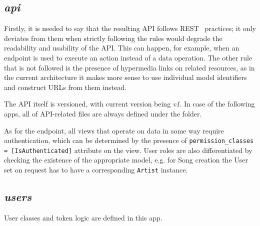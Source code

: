 \subsection{\textit{api}}
Firstly, it is needed to say that the resulting API follows REST~\cite{restdef} practices; it only deviates from them
when strictly following the rules would degrade the readability and usability of the API.
This can happen, for example, when an endpoint is used to execute an action instead of a data operation.
The other rule that is not followed is the presence of hypermedia links on related resources,
as in the current architecture it makes more sense to use
individual model identifiers and construct URLs from them instead.

The API itself is versioned, with current version being \textit{v1}.
In case of the following apps, all of API-related files are always defined under the  folder.

As for the endpoint, all views that operate on data in some way require authentication, which can be determined
by the presence of \texttt{permission_classes = [IsAuthenticated]} attribute on the view. User roles
are also differentiated by checking the existence of the appropriate model, e.g. for Song creation the User set
on request has to have a corresponding \texttt{Artist} instance.

\subsection{\textit{users}}
User classes and token logic are defined in this app.

